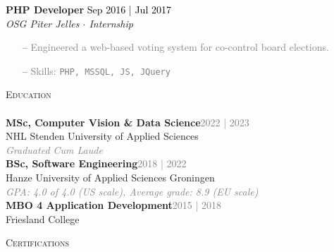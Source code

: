 \documentclass[a4paper]{article}
\newcommand{\lineunder} {
    \vspace*{-8pt} \\
    \hspace*{-18pt} \hrulefill \\
}
\newcommand{\header} [1] {
    {\hspace*{-18pt}\vspace*{6pt} \textsc{#1}}
    \vspace*{-6pt} \lineunder
}
\begin{document}
\textbf{PHP Developer} \hfill \textcolor{black}{Sep 2016 | Jul 2017}\\
\textit{OSG Piter Jelles $\cdot$ Internship}\\
\vspace{-1mm}
\begin{itemize} \itemsep 1pt
	\item[--] \textcolor{gray}{Engineered a web-based voting system for co-control board elections.}
	\item[--] \textcolor{gray}{Skills: \texttt{PHP, MSSQL, JS, JQuery}}
\end{itemize}


\vspace{5mm}

\header{Education}
\vspace{2mm}
\textbf{MSc, Computer Vision \& Data Science}\hfill \textcolor{gray}{2022 | 2023}\\
NHL Stenden University of Applied Sciences\\
\vspace{1mm}
\textcolor{gray}{
	\emph{Graduated Cum Laude}
}\\
\vspace{4mm}
\textbf{BSc, Software Engineering}\hfill \textcolor{gray}{2018 | 2022}\\
Hanze University of Applied Sciences Groningen\\
\vspace{1mm}
\textcolor{gray}{
	\emph{GPA: 4.0 of 4.0 (US scale), Average grade: 8.9 (EU scale)}
}\\
\vspace{4mm}
\textbf{MBO 4 Application Development}\hfill \textcolor{gray}{2015 | 2018}\\
Friesland College\\


\newpage

\header{Certifications}
\end{document}
